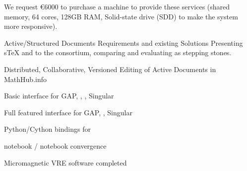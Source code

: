 \begin{workpackage}
\begin{tasklist}
\begin{task}[lead=USO,id=oommf-nb-ve,title=Online portal for
  micromagnetic VRE demonstrator,PM=3,partners={SR,JU},wphases=21-24]

  We request \euro{6000} to purchase a machine to provide these
  services (shared memory, 64 cores, 128GB RAM, Solid-state drive (SDD)
  to make the system more responsive).
\end{task}

\end{tasklist}

\begin{wpdelivs}
  \begin{wpdeliv}[id=adstex,due=6,nature=R,dissem=PU,lead=JU]
    {Active/Structured Documents Requirements and existing Solutions} Presenting sTeX and
    \Jupyter to the consortium, comparing and evaluating as stepping stones.
  \end{wpdeliv}
    \begin{wpdeliv}[id=mathhub-editing,due=12,nature=DEM,dissem=PU,lead=JU]
      {Distributed, Collaborative, Versioned Editing of Active Documents in MathHub.info}
    \end{wpdeliv}
  \begin{wpdeliv}[due=14,id=ipython-kernels-basic,dissem=PU,nature=OTHER,lead=PS]
      {Basic \Jupyter interface for GAP, \PariGP, \Sage, Singular}
  \end{wpdeliv}
  \begin{wpdeliv}[due=12,id=ipython-kernels,dissem=PU,nature=OTHER,lead=PS]
      {Full featured \Jupyter interface for GAP, \PariGP, Singular}
  \end{wpdeliv}
  \begin{wpdeliv}[due=24,id=pari-python-lib,dissem=PU,nature=OTHER,lead=UB]
	  {Python/Cython bindings for \PariGP}
  \end{wpdeliv}
  \begin{wpdeliv}[due=12,id=ipython-kernel-sage,dissem=PU,nature=DEM,lead=PS]
      {\Sage notebook / \Jupyter notebook convergence}
  \end{wpdeliv}
    \begin{wpdeliv}[due=15,id=oommf-nb,dissem=PU,nature=OTHER,lead=USO]
      {Micromagnetic VRE software completed}
    \end{wpdeliv}


\end{wpdelivs}
\end{workpackage}
